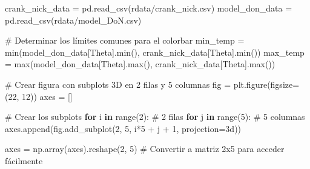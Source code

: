 \documentclass[
  spanish,
  us-letterpaper,
  DIV=11,
  numbers=noendperiod]{scrreprt}
\newenvironment{Shaded}{\begin{snugshade}}{\end{snugshade}}
\newcommand{\BuiltInTok}[1]{\textcolor[rgb]{0.00,0.23,0.31}{#1}}
\newcommand{\CommentTok}[1]{\textcolor[rgb]{0.37,0.37,0.37}{#1}}
\newcommand{\ControlFlowTok}[1]{\textcolor[rgb]{0.00,0.23,0.31}{\textbf{#1}}}
\newcommand{\DecValTok}[1]{\textcolor[rgb]{0.68,0.00,0.00}{#1}}
\newcommand{\KeywordTok}[1]{\textcolor[rgb]{0.00,0.23,0.31}{\textbf{#1}}}
\newcommand{\NormalTok}[1]{\textcolor[rgb]{0.00,0.23,0.31}{#1}}
\newcommand{\OperatorTok}[1]{\textcolor[rgb]{0.37,0.37,0.37}{#1}}
\newcommand{\StringTok}[1]{\textcolor[rgb]{0.13,0.47,0.30}{#1}}
\newcommand{\VerbatimStringTok}[1]{\textcolor[rgb]{0.13,0.47,0.30}{#1}}
\theoremstyle{definition}
\theoremstyle{plain}
\theoremstyle{remark}
\begin{document}
\begin{Shaded}
\begin{Highlighting}[]
\NormalTok{crank\_nick\_data }\OperatorTok{=}\NormalTok{ pd.read\_csv(}\VerbatimStringTok{r\textquotesingle{}data/crank\_nick}\DecValTok{.}\VerbatimStringTok{csv\textquotesingle{}}\NormalTok{)}
\NormalTok{model\_don\_data }\OperatorTok{=}\NormalTok{ pd.read\_csv(}\VerbatimStringTok{r\textquotesingle{}data/model\_DoN}\DecValTok{.}\VerbatimStringTok{csv\textquotesingle{}}\NormalTok{)}

\CommentTok{\# Determinar los límites comunes para el colorbar}
\NormalTok{min\_temp }\OperatorTok{=} \BuiltInTok{min}\NormalTok{(model\_don\_data[}\StringTok{\textquotesingle{}Theta\textquotesingle{}}\NormalTok{].}\BuiltInTok{min}\NormalTok{(), crank\_nick\_data[}\StringTok{\textquotesingle{}Theta\textquotesingle{}}\NormalTok{].}\BuiltInTok{min}\NormalTok{())}
\NormalTok{max\_temp }\OperatorTok{=} \BuiltInTok{max}\NormalTok{(model\_don\_data[}\StringTok{\textquotesingle{}Theta\textquotesingle{}}\NormalTok{].}\BuiltInTok{max}\NormalTok{(), crank\_nick\_data[}\StringTok{\textquotesingle{}Theta\textquotesingle{}}\NormalTok{].}\BuiltInTok{max}\NormalTok{())}

\CommentTok{\# Crear figura con subplots 3D en 2 filas y 5 columnas}
\NormalTok{fig }\OperatorTok{=}\NormalTok{ plt.figure(figsize}\OperatorTok{=}\NormalTok{(}\DecValTok{22}\NormalTok{, }\DecValTok{12}\NormalTok{))}
\NormalTok{axes }\OperatorTok{=}\NormalTok{ []}

\CommentTok{\# Crear los subplots}
\ControlFlowTok{for}\NormalTok{ i }\KeywordTok{in} \BuiltInTok{range}\NormalTok{(}\DecValTok{2}\NormalTok{):  }\CommentTok{\# 2 filas}
    \ControlFlowTok{for}\NormalTok{ j }\KeywordTok{in} \BuiltInTok{range}\NormalTok{(}\DecValTok{5}\NormalTok{):  }\CommentTok{\# 5 columnas}
\NormalTok{        axes.append(fig.add\_subplot(}\DecValTok{2}\NormalTok{, }\DecValTok{5}\NormalTok{, i}\OperatorTok{*}\DecValTok{5} \OperatorTok{+}\NormalTok{ j }\OperatorTok{+} \DecValTok{1}\NormalTok{, projection}\OperatorTok{=}\StringTok{\textquotesingle{}3d\textquotesingle{}}\NormalTok{))}

\NormalTok{axes }\OperatorTok{=}\NormalTok{ np.array(axes).reshape(}\DecValTok{2}\NormalTok{, }\DecValTok{5}\NormalTok{)  }\CommentTok{\# Convertir a matriz 2x5 para acceder fácilmente}


\end{Highlighting}
\end{Shaded}
\end{document}
